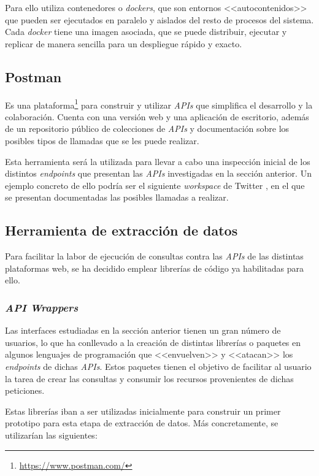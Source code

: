 Para ello utiliza contenedores o \textit{dockers}, que son entornos <<autocontenidos>> que pueden ser ejecutados en paralelo y aislados del resto de procesos del sistema. Cada \textit{docker} tiene una imagen asociada, que se puede distribuir, ejecutar y replicar de manera sencilla para un despliegue rápido y exacto.

\subsection{Postman}

Es una plataforma\footnote{\url{https://www.postman.com/}} para construir y utilizar \textit{APIs} que simplifica el desarrollo y la colaboración. Cuenta con una versión web y una aplicación de escritorio, además de un repositorio público de colecciones de \textit{APIs} y documentación sobre los posibles tipos de llamadas que se les puede realizar.

Esta herramienta será la utilizada para llevar a cabo una inspección inicial de los distintos \textit{endpoints} que presentan las \textit{APIs} investigadas en la sección anterior. Un ejemplo concreto de ello podría ser el siguiente \textit{workspace} de Twitter \cite{postmanTwitterAPI}, en el que se presentan documentadas las posibles llamadas a realizar.

\subsection{Herramienta de extracción de datos}

Para facilitar la labor de ejecución de consultas contra las \textit{APIs} de las distintas plataformas web, se ha decidido emplear librerías de código ya habilitadas para ello.

\subsubsection{\textit{API Wrappers}} \label{section:api_wrappers}

Las interfaces estudiadas en la sección anterior tienen un gran número de usuarios, lo que ha conllevado a la creación de distintas librerías o paquetes en algunos lenguajes de programación que <<envuelven>> y <<atacan>> los \textit{endpoints} de dichas \textit{APIs}. Estos paquetes tienen el objetivo de facilitar al usuario la tarea de crear las consultas y consumir los recursos provenientes de dichas peticiones.

Estas librerías iban a ser utilizadas inicialmente para construir un primer prototipo para esta etapa de extracción de datos. Más concretamente, se utilizarían las siguientes:

